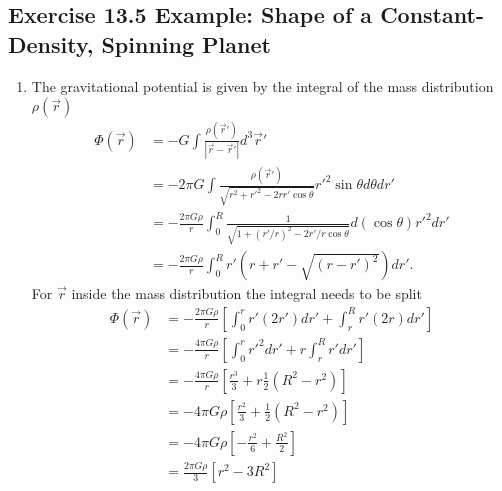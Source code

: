 \documentclass[../main.tex]{subfiles}
\begin{document}
\subsection{Exercise 13.5 Example: Shape of a Constant-Density, Spinning Planet}
\begin{enumerate}[label=(\alph*)]
\item The gravitational potential is given by the integral of the mass distribution $\rho(\vec{r})$
\begin{align}
    \Phi(\vec{r})
    &=-G\int\frac{\rho(\vec{r}')}{|\vec{r}-\vec{r}'|}d^3\vec{r}'\\
    &=-2\pi G\int\frac{\rho(\vec{r}')}{\sqrt{r^2+{r'}^2-2rr'\cos\theta}}r'^2\sin\theta d\theta dr'\\
    &=-\frac{2\pi G\rho}{r}\int_0^R\frac{1}{\sqrt{1+(r'/r)^2-2r'/r\cos\theta}}d(\cos\theta) r'^2dr'\\
    &=-\frac{2\pi G\rho}{r}\int_0^Rr'\left(r+r'-\sqrt{(r-r')^2}\right)dr'.
\end{align}
For $\vec{r}$ inside the mass distribution the integral needs to be split
\begin{align}
    \Phi(\vec{r})
    &=-\frac{2\pi G\rho}{r}\left[\int_0^rr'\left(2r'\right)dr'+\int_r^Rr'\left(2r\right)dr'\right]\\
    &=-\frac{4\pi G\rho}{r}\left[\int_0^rr'^2dr'+r\int_r^Rr'dr'\right]\\
    &=-\frac{4\pi G\rho}{r}\left[\frac{r^3}{3}+r\frac{1}{2}(R^2-r^2)\right]\\
    &=-4\pi G\rho\left[\frac{r^2}{3}+\frac{1}{2}(R^2-r^2)\right]\\
    &=-4\pi G\rho\left[-\frac{r^2}{6}+\frac{R^2}{2}\right]\\
    &=\frac{2\pi G\rho}{3}\left[r^2-3R^2\right]
\end{align}


\end{enumerate}
\end{document}
